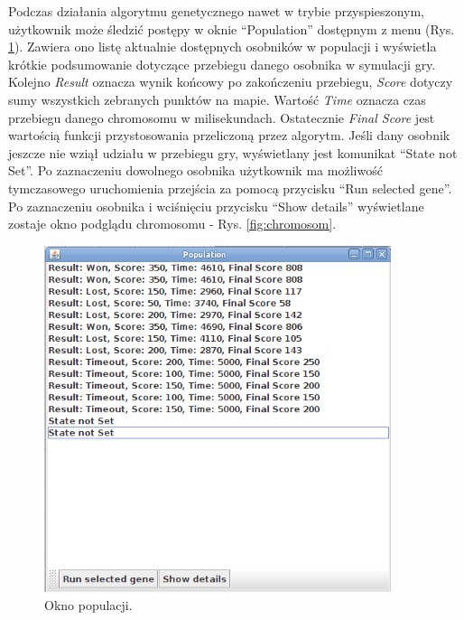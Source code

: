 \begin{par}
	Podczas działania algorytmu genetycznego nawet w trybie przyspieszonym, użytkownik może śledzić postępy w oknie ``Population'' dostępnym z menu (Rys. \ref{fig:populacja}).
	Zawiera ono listę aktualnie dostępnych osobników w populacji i wyświetla krótkie podsumowanie dotyczące przebiegu danego osobnika w symulacji gry. Kolejno \textit{Result} oznacza wynik końcowy po zakończeniu przebiegu, \textit{Score} dotyczy sumy wszystkich zebranych punktów na mapie. Wartość \textit{Time} oznacza czas przebiegu danego chromosomu w milisekundach.
	Ostatecznie \textit{Final Score} jest wartością funkcji przystosowania przeliczoną przez algorytm. Jeśli dany osobnik jeszcze nie wziął udziału w przebiegu gry, wyświetlany jest komunikat ``State not Set''. Po zaznaczeniu dowolnego osobnika użytkownik ma możliwość tymczasowego uruchomienia przejścia za pomocą przycisku ``Run selected gene''. Po zaznaczeniu osobnika i wciśnięciu przycisku ``Show details'' wyświetlane zostaje okno podglądu chromosomu - Rys. \ref{fig:chromosom}.

	\begin{figure}[!h]
		\centering
		\includegraphics[width=4in]{obrazki/populacja.png}
		\caption{Okno populacji.}
		\label{fig:populacja}
	\end{figure}



\end{par}

